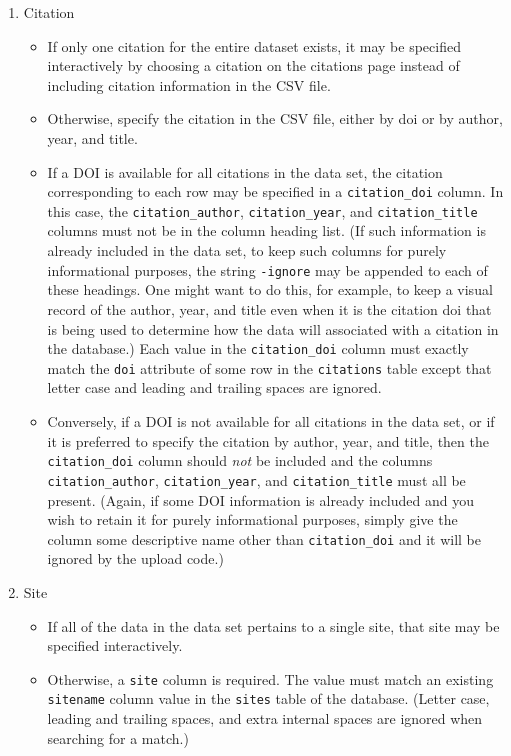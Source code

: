 \begin{enumerate}

\item Citation

\begin{itemize}
\item If only one citation for the entire dataset exists, it may be specified
  interactively by choosing a citation on the citations page instead of
  including citation information in the CSV file.
\item Otherwise, specify the citation in the CSV file, either by doi or by
  author, year, and title.
\item If a DOI is available for all citations in the data set, the citation
  corresponding to each row may be specified in a \verb|citation_doi| column.  In
  this case, the \verb|citation_author|, \verb|citation_year|, and \verb|citation_title|
  columns must not be in the column heading list.  (If such information is
  already included in the data set, to keep such columns for purely
  informational purposes, the string \verb|-ignore| may be appended to each of
  these headings.  One might want to do this, for example, to keep a visual
  record of the author, year, and title even when it is the citation doi
  that is being used to determine how the data will associated with a
  citation in the database.)  Each value in the \verb|citation_doi| column must
  exactly match the \verb|doi| attribute of some row in the \verb|citations| table except
  that letter case and leading and trailing spaces are ignored.
\item Conversely, if a DOI is not available for all citations in the data set,
  or if it is preferred to specify the citation by author, year, and title,
  then the \verb|citation_doi| column should \textit{not} be included and the columns
  \verb|citation_author|, \verb|citation_year|, and \verb|citation_title| must all be
  present.  (Again, if some DOI information is already included and you wish
  to retain it for purely informational purposes, simply give the column
  some descriptive name other than \verb|citation_doi| and it will be ignored by
  the upload code.)
\end{itemize}

\item Site

\begin{itemize}
\item If all of the data in the data set pertains to a single site, that site
  may be specified interactively.
\item Otherwise, a \verb|site| column is required.  The value must match an existing
  \verb|sitename| column value in the \verb|sites| table of the database.  (Letter
  case, leading and trailing spaces, and extra internal spaces are ignored
  when searching for a match.)
\end{itemize}


\end{enumerate}
